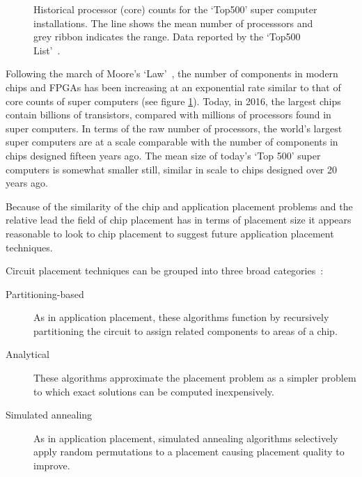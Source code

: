 			\begin{figure}
				\center
				
				\caption[Historical core counts for the `Top500' super computers.]%
				{Historical processor (core) counts for the `Top500' super
				computer installations. The line shows the mean number of processsors and
				grey ribbon indicates the range. Data reported by the `Top500
				List'~\cite{meuer16j}.}
				\label{fig:top500-num-processors}
			\end{figure}
			
			Following the march of Moore's `Law'~\cite{moore75}, the number of
			components in modern chips and FPGAs has been increasing at an
			exponential rate similar to that of core counts of super computers (see
			figure \ref{fig:top500-num-processors}). Today, in 2016, the largest
			chips contain billions of transistors, compared with millions of
			processors found in super computers. In terms of the raw number of
			processors, the world's largest super computers are at a scale comparable
			with the number of components in chips designed fifteen years ago. The
			mean size of today's `Top 500' super computers is somewhat smaller still,
			similar in scale to chips designed over 20 years ago.
			
			Because of the similarity of the chip and application placement problems
			and the relative lead the field of chip placement has in terms of
			placement size it appears reasonable to look to chip placement to suggest
			future application placement techniques.
			
			Circuit placement techniques can be grouped into three broad
			categories~\cite{kahng11}:
			
			\begin{description}
				
				\item[Partitioning-based] As in application placement, these algorithms
				function by recursively partitioning the circuit to assign
				related components to areas of a chip.
				
				\item[Analytical] These algorithms approximate the placement problem as
				a simpler problem to which exact solutions can be computed
				inexpensively.
				
				\item[Simulated annealing] As in application placement, simulated
				annealing algorithms selectively apply random permutations to a
				placement causing placement quality to improve.
				
			\end{description}
			
